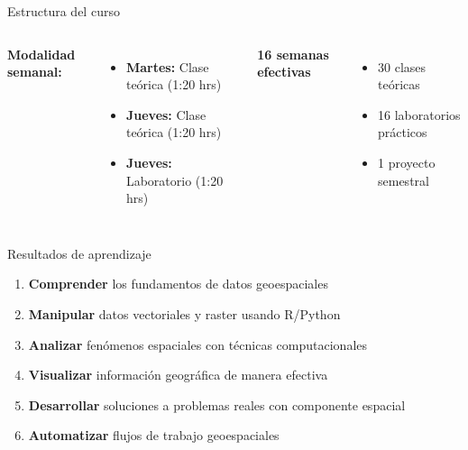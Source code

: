 \documentclass[10pt]{beamer}
\newcommand{\examplebox}[2]{
\begin{tcolorbox}[colframe=usachblue,colback=white,title=#1]
#2
\end{tcolorbox}
}
\begin{document}
\begin{frame}{Estructura del curso}
    \begin{columns}
        \textbf{Modalidad semanal:}
        \begin{itemize}
            \item \textcolor{usachblue}{} \textbf{Martes:} Clase teórica (1:20 hrs)
            \item \textcolor{usachblue}{} \textbf{Jueves:} Clase teórica (1:20 hrs)
            \item \textcolor{usachred}{} \textbf{Jueves:} Laboratorio (1:20 hrs)
        \end{itemize}
        
        \vspace{0.3cm}
        \textbf{16 semanas efectivas}
        \begin{itemize}
            \item 30 clases teóricas
            \item 16 laboratorios prácticos
            \item 1 proyecto semestral
        \end{itemize}
        
    \end{columns}
\end{frame}

\begin{frame}{Resultados de aprendizaje}
    \examplebox{Al finalizar el curso serás capaz de:}{
        \begin{enumerate}
            \item \textbf{Comprender} los fundamentos de datos geoespaciales
            \item \textbf{Manipular} datos vectoriales y raster usando R/Python
            \item \textbf{Analizar} fenómenos espaciales con técnicas computacionales
            \item \textbf{Visualizar} información geográfica de manera efectiva
            \item \textbf{Desarrollar} soluciones a problemas reales con componente espacial
            \item \textbf{Automatizar} flujos de trabajo geoespaciales
        \end{enumerate}
    }
\end{frame}
\end{document}
